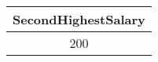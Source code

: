 \begin{tabular}{|c|}
\hline
    \textbf{SecondHighestSalary}\\ \hline
    200 \\ \hline
\end{tabular}
